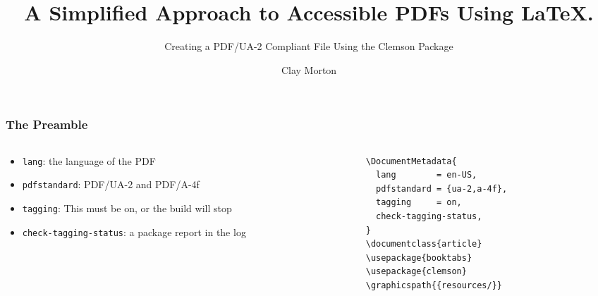 \documentclass{ltx-talk}
\title{A Simplified Approach to Accessible PDFs Using LaTeX.}
\subtitle{Creating a PDF/UA-2 Compliant File Using the Clemson Package}
\author{Clay Morton}
\institute{Clemson University}
\date{}
\begin{document}
\begin{frame}
  \maketitle
\end{frame}

\begin{frame*}
  \frametitle{The Preamble}
  \begin{columns}
    \begin{column}{.34\textwidth}
      \begin{itemize}
        \item \texttt{lang}: the language of the PDF
        \item \texttt{pdfstandard}: PDF/UA-2 and PDF/A-4f
        \item \texttt{tagging}: This must be on, or the build will stop
        \item \texttt{check-tagging-status}: a package report in the log
      \end{itemize}
    \end{column}
    \begin{column}{.44\textwidth}
\small
\begin{verbatim}
\DocumentMetadata{
  lang        = en-US,
  pdfstandard = {ua-2,a-4f},
  tagging     = on,
  check-tagging-status,
}
\documentclass{article}
\usepackage{booktabs}
\usepackage{clemson}
\graphicspath{{resources/}}
\end{verbatim}
    \end{column}
  \end{columns}
\end{frame*}
\end{document}
